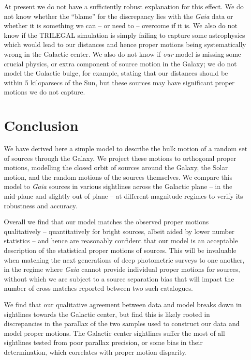 \documentclass[fleqn,usenatbib]{mnras}
\begin{document}
At present we do not have a sufficiently robust explanation for this effect.
We do not know whether the ``blame'' for the discrepancy lies with the \textit{Gaia} data or whether it is something we can -- or need to -- overcome if it is.
We also do not know if the TRILEGAL simulation is simply failing to capture some astrophysics which would lead to our distances and hence proper motions being systematically wrong in the Galactic center.
We also do not know if \textit{our} model is missing some crucial physics, or extra component of source motion in the Galaxy; we do not model the Galactic bulge, for example, stating that our distances should be within 5 kiloparsecs of the Sun, but these sources may have significant proper motions we do not capture.

\section{Conclusion}
We have derived here a simple model to describe the bulk motion of a random set of sources through the Galaxy.
We project these motions to orthogonal proper motions, modelling the closed orbit of sources around the Galaxy, the Solar motion, and the random motions of the sources themselves.
We compare this model to \textit{Gaia} sources in various sightlines across the Galactic plane -- in the mid-plane and slightly out of plane -- at different magnitude regimes to verify its robustness and accuracy.

Overall we find that our model matches the observed proper motions qualitatively -- quantitatively for bright sources, albeit aided by lower number statistics -- and hence are reasonably confident that our model is an acceptable description of the statistical proper motions of sources.
This will be invaluable when matching the next generations of deep photometric surveys to one another, in the regime where \textit{Gaia} cannot provide individual proper motions for sources, without which we are subject to a source separation bias that will impact the number of cross-matches reported between two such catalogues.

We find that our qualitative agreement between data and model breaks down in sightlines towards the Galactic center, but find this is likely rooted in discrepancies in the parallax of the two samples used to construct our data and model proper motions.
The Galactic center sightlines suffer the most of all sightlines tested from poor parallax precision, or some bias in their determination, which correlates with proper motion disparity.
\end{document}
